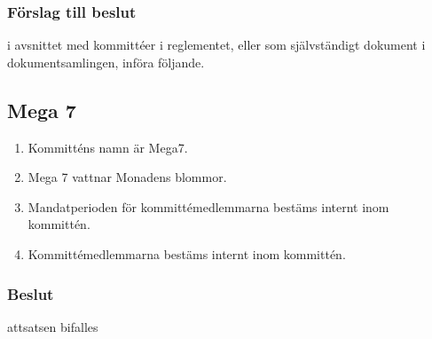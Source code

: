 \documentclass[protokoll]{dvd}
\begin{document}
\subsubsection*{Förslag till beslut}
\begin{attsatser}
    \item i avsnittet med kommittéer i reglementet, eller som självständigt dokument i dokumentsamlingen, införa följande.

    \begin{displayquote}
        \subsection*{Mega 7}
        \begin{enumerate}[label=\arabic* §]
            \item Kommitténs namn är Mega7.

            \item Mega 7 vattnar Monadens blommor.

            \item Mandatperioden för kommittémedlemmarna bestäms internt inom kommittén.

            \item Kommittémedlemmarna bestäms internt inom kommittén.
        \end{enumerate}
    \end{displayquote}
\end{attsatser}
\subsubsection*{Beslut}
\begin{attsatser}
    \item attsatsen bifalles
\end{attsatser}
\end{document}
